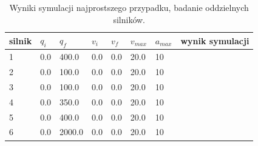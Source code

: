 \documentclass[a4paper, 12pt]{article}
\begin{document}
	\begin{table}[H]
	\centering
	\begin{tabular}{|m{2.5em}|m{4em}|m{4em}|m{4em}|m{4em}|m{4em}|m{4em}|m{5em}|}
	\hline
	silnik&$ q_i $ & $ q_f $ & $ v_i $ & $ v_f $ & $ v_{max} $ & $ a_{max} $&wynik symulacji\\
	\hline
	\hline
	\hspace{1em}1& 0.0 & 400.0 & 0.0 & 0.0 & 20.0 & 10&\hspace{2em}\checkmark\\ %
	\hline
	\hspace{1em}2& 0.0 & 100.0 & 0.0 & 0.0 & 20.0 & 10&\hspace{2em}\checkmark\\  %
	\hline
	\hspace{1em}3& 0.0 & 100.0 & 0.0 & 0.0 & 20.0 & 10&\hspace{2em}\checkmark\\ %
	\hline
	\hspace{1em}4& 0.0 & 350.0 & 0.0 & 0.0 & 20.0 & 10&\hspace{2em}\checkmark\\  %
	\hline
	\hspace{1em}5& 0.0 & 400.0 & 0.0 & 0.0 & 20.0 & 10&\hspace{2em}\checkmark\\  %
	\hline
	\hspace{1em}6& 0.0 & 2000.0 & 0.0 & 0.0 & 20.0 & 10&\hspace{2em}\checkmark\\  %
	\hline
	\end{tabular}
	\caption{Wyniki symulacji najprostszego przypadku, badanie oddzielnych silników.}
	\label{tab:setup7}
	\end{table}
	
\end{document}
